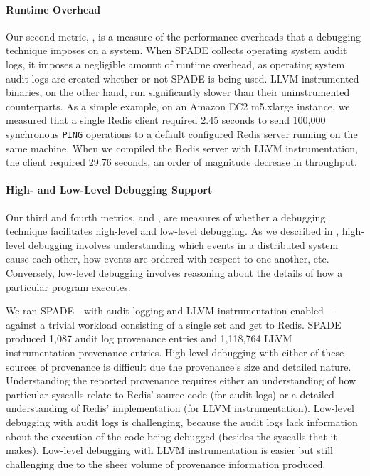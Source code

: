 \paragraph{Runtime Overhead}
Our second metric, , is a measure of the performance
overheads that a debugging technique imposes on a system.
%
When SPADE collects operating system audit logs, it imposes a negligible amount
of runtime overhead, as operating system audit logs are created whether or not
SPADE is being used. LLVM instrumented binaries, on the other hand, run
significantly slower than their uninstrumented counterparts. As a simple
example, on an Amazon EC2 m5.xlarge instance, we measured that a single Redis
client required 2.45 seconds to send 100,000 synchronous \texttt{PING}
operations to a default configured Redis server running on the same machine.
When we compiled the Redis server with LLVM instrumentation, the client
required 29.76 seconds, an order of magnitude decrease in throughput.

\paragraph{High- and Low-Level Debugging Support}
Our third and fourth metrics,  and
, are measures of whether a debugging
technique facilitates high-level and low-level debugging. As we described in
, high-level debugging involves understanding which
events in a distributed system cause each other, how events are ordered with
respect to one another, etc. Conversely, low-level debugging involves reasoning
about the details of how a particular program executes.

We ran SPADE---with audit logging and LLVM instrumentation enabled---against a
trivial workload consisting of a single set and get to Redis. SPADE produced
1,087 audit log provenance entries and 1,118,764 LLVM instrumentation
provenance entries. High-level debugging with either of these sources of
provenance is difficult due the provenance's size and detailed nature.
Understanding the reported provenance requires either an understanding of how
particular syscalls relate to Redis' source code (for audit logs) or a detailed
understanding of Redis' implementation (for LLVM instrumentation). Low-level
debugging with audit logs is challenging, because the audit logs lack
information about the execution of the code being debugged (besides the
syscalls that it makes). Low-level debugging with LLVM instrumentation is easier
but still challenging due to the sheer volume of provenance information
produced.

